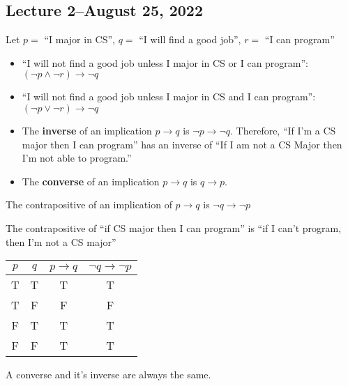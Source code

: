 \documentclass{scrreprt}
\begin{document}
\subsection{Lecture 2--August 25, 2022}

Let $p=$ ``I major in CS'', $q=$ ``I will find a good job'', $r=$ ``I can program''

\begin{itemize}

	\item ``I will not find a good job unless I major in CS or I can program'': $(\neg p \land \neg r)\rightarrow \neg q$

	\item ``I will not find a good job unless I major in CS and I can program'': $(\neg p \lor \neg r)\rightarrow \neg q$

	\item The \textbf{inverse} of an implication $p\rightarrow q$ is $\neg p\rightarrow \neg q$.
	      Therefore, ``If I'm a CS major then I can program'' has an inverse of
	      ``If I am not a CS Major then I'm not able to program.''

	\item The \textbf{converse} of an implication $p\rightarrow q$ is $q\rightarrow p$.

\end{itemize}

\begin{definition}[Contrapositive]
	The contrapositive of an implication of $p\rightarrow q$ is $\neg q\rightarrow \neg p$

	The contrapositive of ``if CS major then I can program'' is ``if I can't program, then I'm not a CS major''

	\begin{tabular}{|c|c|c|c|}
		\hline
		$p$ & $q$ & $p\rightarrow q$ & $\neg q\rightarrow \neg p$ \\
		\hline
		T   & T   & T                & T                          \\
		T   & F   & F                & F                          \\
		F   & T   & T                & T                          \\
		F   & F   & T                & T                          \\
		\hline
	\end{tabular}

	A converse and it's inverse are always the same.

\end{definition}
\end{document}
